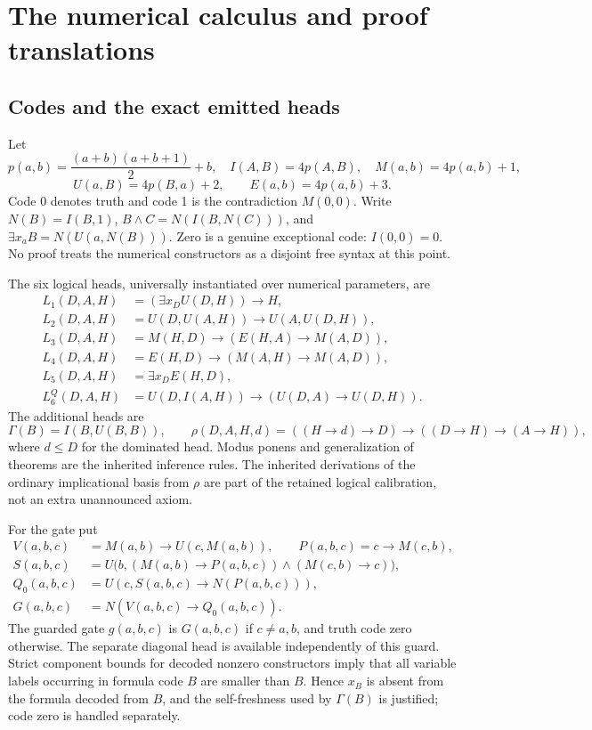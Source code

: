 \documentclass[11pt,letterpaper]{article}
\begin{document}
\section{The numerical calculus and proof translations}
\label{sec:logic}

\subsection{Codes and the exact emitted heads}
Let
\[
 p(a,b)=\frac{(a+b)(a+b+1)}2+b,
\quad I(A,B)=4p(A,B),\quad M(a,b)=4p(a,b)+1,
\]
\[
 U(a,B)=4p(B,a)+2,\qquad E(a,b)=4p(a,b)+3.
\]
Code 0 denotes truth and code 1 is the contradiction $M(0,0)$. Write
$N(B)=I(B,1)$, $B\wedge C=N(I(B,N(C)))$, and
$\exists x_a B=N(U(a,N(B)))$. Zero is a genuine exceptional code:
$I(0,0)=0$. No proof treats the numerical constructors as a disjoint free
syntax at this point.

The six logical heads, universally instantiated over numerical parameters,
are
\begin{align*}
 L_1(D,A,H)&=(\exists x_D U(D,H))\to H,\\
 L_2(D,A,H)&=U(D,U(A,H))\to U(A,U(D,H)),\\
 L_3(D,A,H)&=M(H,D)\to(E(H,A)\to M(A,D)),\\
 L_4(D,A,H)&=E(H,D)\to(M(A,H)\to M(A,D)),\\
 L_5(D,A,H)&=\exists x_D E(H,D),\\
 L_6^Q(D,A,H)&=U(D,I(A,H))\to(U(D,A)\to U(D,H)).
\end{align*}
The additional heads are
\[
 \Gamma(B)=I(B,U(B,B)),\qquad
 \rho(D,A,H,d)=((H\to d)\to D)\to((D\to H)\to(A\to H)),
\]
where $d\le D$ for the dominated head. Modus ponens and generalization of
theorems are the inherited inference rules. The inherited derivations of
the ordinary implicational basis from $\rho$ are part of the retained
logical calibration, not an extra unannounced axiom.

For the gate put
\begin{align*}
 V(a,b,c)&=M(a,b)\to U(c,M(a,b)),\qquad P(a,b,c)=c\to M(c,b),\\
 S(a,b,c)&=U\bigl(b,(M(a,b)\to P(a,b,c))\wedge(M(c,b)\to c)\bigr),\\
 Q_0(a,b,c)&=U(c,S(a,b,c)\to N(P(a,b,c))),\\
 G(a,b,c)&=N(V(a,b,c)\to Q_0(a,b,c)).
\end{align*}
The guarded gate $g(a,b,c)$ is $G(a,b,c)$ if $c\ne a,b$, and truth code
zero otherwise. The separate diagonal head is available independently of
this guard. Strict component bounds for decoded nonzero constructors imply
that all variable labels occurring in formula code $B$ are smaller than
$B$. Hence $x_B$ is absent from the formula decoded from $B$, and the
self-freshness used by $\Gamma(B)$ is justified; code zero is handled
separately.
\end{document}
